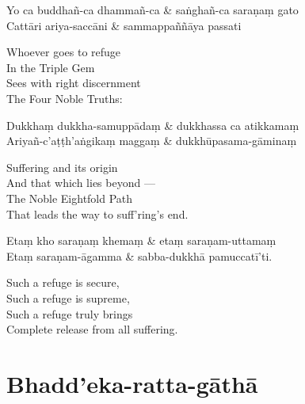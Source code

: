 \begin{twochants}
Yo ca buddhañ-ca dhammañ-ca & saṅghañ-ca saraṇaṃ gato\\
Cattāri ariya-saccāni & sammappaññāya passati\\
\end{twochants}

\begin{english}
  Whoever goes to refuge\\
  In the Triple Gem\\
  Sees with right discernment\\
  The Four Noble Truths:
\end{english}

\begin{twochants}
Dukkhaṃ dukkha-samuppādaṃ & dukkhassa ca atikkamaṃ\\
Ariyañ-c'aṭṭh'aṅgikaṃ maggaṃ & dukkhūpasama-gāminaṃ\\
\end{twochants}

\begin{english}
  Suffering and its origin\\
  And that which lies beyond ---\\
  The Noble Eightfold Path\\
  That leads the way to suff'ring's end.
\end{english}

\begin{twochants}
Etaṃ kho saraṇaṃ khemaṃ & etaṃ saraṇam-uttamaṃ\\
Etaṃ saraṇam-āgamma & sabba-dukkhā pamuccatī'ti.
\end{twochants}

\begin{english}
  Such a refuge is secure,\\
  Such a refuge is supreme,\\
  Such a refuge truly brings\\
  Complete release from all suffering.
\end{english}


\section{Bhadd'eka-ratta-gāthā}



